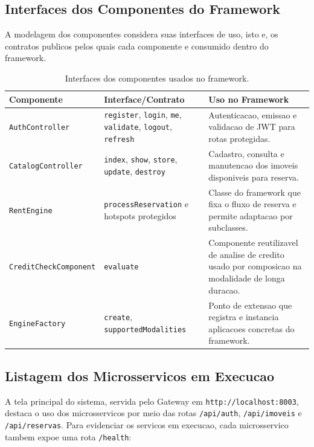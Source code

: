 \documentclass[12pt,a4paper]{article}
\begin{document}
\subsection{Interfaces dos Componentes do Framework}
A modelagem dos componentes considera suas interfaces de uso, isto e, os contratos
publicos pelos quais cada componente e consumido dentro do framework.

\begin{table}[htbp]
    \centering
    \small
    \begin{tabularx}{\textwidth}{p{4.2cm} p{4.3cm} Y}
    \toprule
    \textbf{Componente} & \textbf{Interface/Contrato} & \textbf{Uso no Framework} \\
    \midrule
    \texttt{AuthController} & \texttt{register}, \texttt{login}, \texttt{me}, \texttt{validate}, \texttt{logout}, \texttt{refresh} & Autenticacao, emissao e validacao de JWT para rotas protegidas. \\
    \texttt{CatalogController} & \texttt{index}, \texttt{show}, \texttt{store}, \texttt{update}, \texttt{destroy} & Cadastro, consulta e manutencao dos imoveis disponiveis para reserva. \\
    \texttt{RentEngine} & \texttt{processReservation} e hotspots protegidos & Classe do framework que fixa o fluxo de reserva e permite adaptacao por subclasses. \\
    \texttt{CreditCheckComponent} & \texttt{evaluate} & Componente reutilizavel de analise de credito usado por composicao na modalidade de longa duracao. \\
    \texttt{EngineFactory} & \texttt{create}, \texttt{supportedModalities} & Ponto de extensao que registra e instancia aplicacoes concretas do framework. \\
    \bottomrule
    \end{tabularx}
    \caption{Interfaces dos componentes usados no framework.}
    \label{tab:interfaces_componentes}
\end{table}

\subsection{Listagem dos Microsservicos em Execucao}
A tela principal do sistema, servida pelo Gateway em \texttt{http://localhost:8003},
destaca o uso dos microsservicos por meio das rotas \texttt{/api/auth},
\texttt{/api/imoveis} e \texttt{/api/reservas}. Para evidenciar os servicos em
execucao, cada microsservico tambem expoe uma rota \texttt{/health}:
\end{document}
